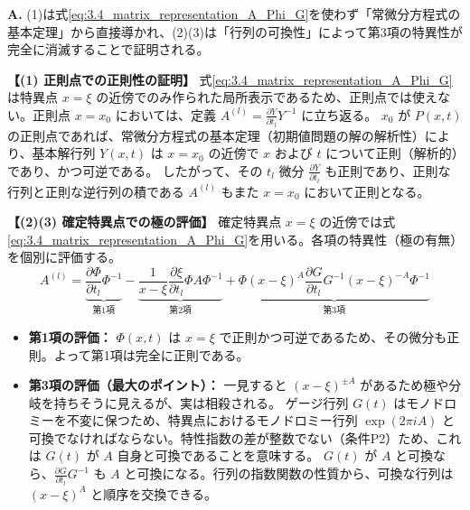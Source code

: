 \begin{Q}
\textbf{A.} (1)は式\eqref{eq:3.4_matrix_representation_A_Phi_G}を使わず「常微分方程式の基本定理」から直接導かれ、(2)(3)は「行列の可換性」によって第3項の特異性が完全に消滅することで証明される。

\textbf{【(1) 正則点での正則性の証明】}
式\eqref{eq:3.4_matrix_representation_A_Phi_G}は特異点 $x=\xi$ の近傍でのみ作られた局所表示であるため、正則点では使えない。正則点 $x=x_0$ においては、定義 $A^{(l)} = \frac{\partial Y}{\partial t_l}Y^{-1}$ に立ち返る。
$x_0$ が $P(x,t)$ の正則点であれば、常微分方程式の基本定理（初期値問題の解の解析性）により、基本解行列 $Y(x,t)$ は $x=x_0$ の近傍で $x$ および $t$ について正則（解析的）であり、かつ可逆である。
したがって、その $t_l$ 微分 $\frac{\partial Y}{\partial t_l}$ も正則であり、正則な行列と正則な逆行列の積である $A^{(l)}$ もまた $x=x_0$ において正則となる。

\textbf{【(2)(3) 確定特異点での極の評価】}
確定特異点 $x=\xi$ の近傍では式\eqref{eq:3.4_matrix_representation_A_Phi_G}を用いる。各項の特異性（極の有無）を個別に評価する。
\[
  A^{(l)} = \underbrace{\frac{\partial \Phi}{\partial t_l}\Phi^{-1}}_{\text{第1項}} - \underbrace{\frac{1}{x-\xi}\frac{\partial \xi}{\partial t_l}\Phi A \Phi^{-1}}_{\text{第2項}} + \underbrace{\Phi(x-\xi)^A \frac{\partial G}{\partial t_l}G^{-1}(x-\xi)^{-A}\Phi^{-1}}_{\text{第3項}}
\]

\begin{itemize}
    \item \textbf{第1項の評価：} $\Phi(x,t)$ は $x=\xi$ で正則かつ可逆であるため、その微分も正則。よって第1項は完全に正則である。
    
    \item \textbf{第3項の評価（最大のポイント）：} 
    一見すると $(x-\xi)^{\pm A}$ があるため極や分岐を持ちそうに見えるが、実は相殺される。
    ゲージ行列 $G(t)$ はモノドロミーを不変に保つため、特異点におけるモノドロミー行列 $\exp(2\pi i A)$ と可換でなければならない。特性指数の差が整数でない（条件P2）ため、これは $G(t)$ が $A$ 自身と可換であることを意味する。
    $G(t)$ が $A$ と可換なら、$\frac{\partial G}{\partial t_l}G^{-1}$ も $A$ と可換になる。行列の指数関数の性質から、可換な行列は $(x-\xi)^A$ と順序を交換できる。
    

\end{itemize}
\end{Q}
